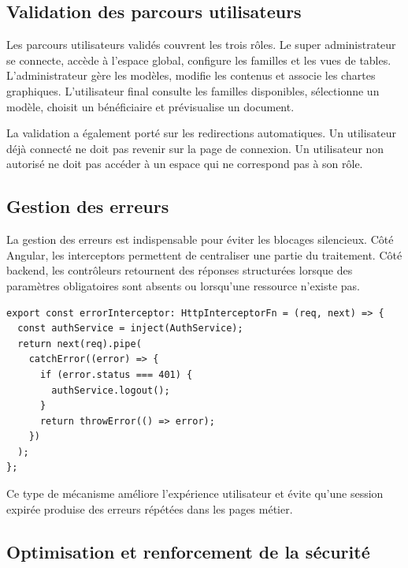 \subsection{Validation des parcours utilisateurs}

Les parcours utilisateurs validés couvrent les trois rôles. Le super administrateur se connecte, accède à l'espace global, configure les familles et les vues de tables. L'administrateur gère les modèles, modifie les contenus et associe les chartes graphiques. L'utilisateur final consulte les familles disponibles, sélectionne un modèle, choisit un bénéficiaire et prévisualise un document.


La validation a également porté sur les redirections automatiques. Un utilisateur déjà connecté ne doit pas revenir sur la page de connexion. Un utilisateur non autorisé ne doit pas accéder à un espace qui ne correspond pas à son rôle.

\subsection{Gestion des erreurs}

La gestion des erreurs est indispensable pour éviter les blocages silencieux. Côté Angular, les interceptors permettent de centraliser une partie du traitement. Côté backend, les contrôleurs retournent des réponses structurées lorsque des paramètres obligatoires sont absents ou lorsqu'une ressource n'existe pas.

\begin{lstlisting}[caption={Principe d'un interceptor d'erreur Angular}]
export const errorInterceptor: HttpInterceptorFn = (req, next) => {
  const authService = inject(AuthService);
  return next(req).pipe(
    catchError((error) => {
      if (error.status === 401) {
        authService.logout();
      }
      return throwError(() => error);
    })
  );
};
\end{lstlisting}

Ce type de mécanisme améliore l'expérience utilisateur et évite qu'une session expirée produise des erreurs répétées dans les pages métier.

\subsection{Optimisation et renforcement de la sécurité}

